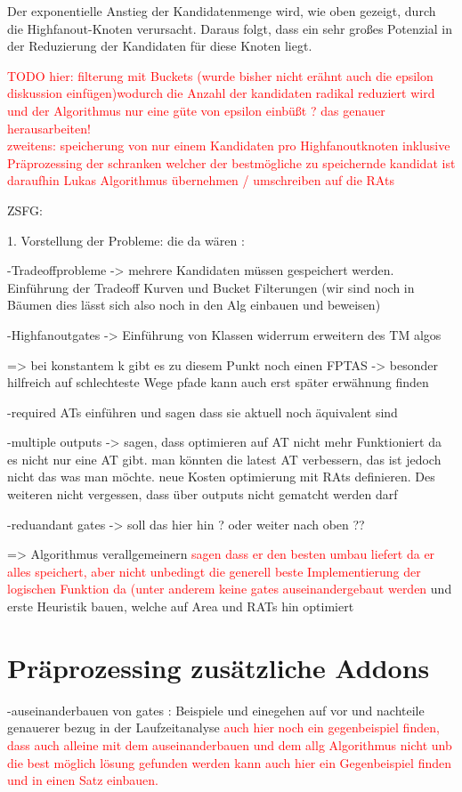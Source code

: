 \documentclass[11pt, a4paper, german]{article}
\begin{document}
 Der exponentielle Anstieg der Kandidatenmenge wird, wie oben gezeigt, durch die Highfanout-Knoten verursacht. Daraus folgt, dass ein sehr großes Potenzial in der Reduzierung der Kandidaten für diese Knoten liegt. 
 
 \textcolor{red}{TODO hier: 
 	filterung mit Buckets (wurde bisher nicht erähnt auch die epsilon diskussion einfügen)wodurch die Anzahl der kandidaten radikal reduziert wird und der Algorithmus nur eine güte von epsilon einbüßt ? das genauer herausarbeiten!\\
 	zweitens: speicherung von nur einem Kandidaten pro Highfanoutknoten inklusive Präprozessing der schranken welcher der bestmögliche zu speichernde kandidat ist\\
 	daraufhin Lukas Algorithmus übernehmen / umschreiben auf die RAts}


\newpage

ZSFG:

1. Vorstellung der Probleme: die da wären :

	-Tradeoffprobleme -> mehrere Kandidaten müssen gespeichert werden. Einführung der Tradeoff Kurven und Bucket Filterungen (wir sind noch in Bäumen dies lässt sich also noch in den Alg einbauen und beweisen) 
	
	-Highfanoutgates -> Einführung von Klassen widerrum erweitern des TM algos 
	
	=> bei konstantem k gibt es zu diesem Punkt noch einen FPTAS -> besonder hilfreich auf schlechteste Wege pfade kann auch erst später erwähnung finden
	
	-required ATs einführen und sagen dass sie aktuell noch äquivalent sind 
	
	-multiple outputs -> sagen, dass optimieren auf AT nicht mehr Funktioniert da es nicht nur eine AT gibt. man könnten die latest AT verbessern, das ist jedoch nicht das was man möchte. neue Kosten optimierung mit RAts definieren. Des weiteren nicht vergessen, dass über outputs nicht gematcht werden darf 
	
	-reduandant gates -> soll das hier hin ? oder weiter nach oben ??
	
	=> Algorithmus verallgemeinern \textcolor{red}{sagen dass er den besten umbau liefert da er alles speichert, aber nicht unbedingt die generell beste Implementierung der logischen Funktion da (unter anderem keine gates auseinandergebaut werden} und erste Heuristik bauen, welche auf Area  und RATs hin optimiert

\section{Präprozessing  zusätzliche Addons}
-auseinanderbauen von gates : Beispiele und einegehen auf vor und nachteile genauerer bezug in der Laufzeitanalyse \textcolor{red}{auch hier noch ein gegenbeispiel finden, dass auch alleine mit dem auseinanderbauen und dem allg Algorithmus nicht unb die best möglich lösung gefunden werden kann auch hier ein Gegenbeispiel finden und in einen Satz einbauen.}
	
\end{document}
